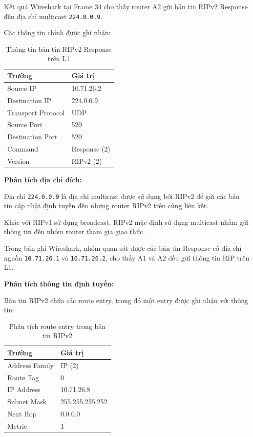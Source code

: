 Kết quả Wireshark tại Frame 34 cho thấy router A2
gửi bản tin RIPv2 Response đến địa chỉ multicast
\texttt{224.0.0.9}.

Các thông tin chính được ghi nhận:

\begin{table}[H]
    \centering
    \caption{Thông tin bản tin RIPv2 Response trên L1}
    \label{tab:n6-rip}
    \renewcommand{\arraystretch}{1.3}
    \begin{tabular}{|l|l|}
        \hline
        \textbf{Trường} & \textbf{Giá trị} \\
        \hline
        Source IP & 10.71.26.2 \\
        \hline
        Destination IP & 224.0.0.9 \\
        \hline
        Transport Protocol & UDP \\
        \hline
        Source Port & 520 \\
        \hline
        Destination Port & 520 \\
        \hline
        Command & Response (2) \\
        \hline
        Version & RIPv2 (2) \\
        \hline
        \end{tabular}
\end{table}

\textbf{Phân tích địa chỉ đích:}

Địa chỉ \texttt{224.0.0.9} là địa chỉ multicast
được sử dụng bởi RIPv2 để gửi các bản tin cập nhật
định tuyến đến những router RIPv2 trên cùng liên kết.

Khác với RIPv1 sử dụng broadcast,
RIPv2 mặc định sử dụng multicast nhằm gửi thông tin
đến nhóm router tham gia giao thức.

Trong bản ghi Wireshark, nhóm quan sát được
các bản tin Response có địa chỉ nguồn
\texttt{10.71.26.1} và \texttt{10.71.26.2},
cho thấy A1 và A2 đều gửi thông tin RIP trên L1.

\textbf{Phân tích thông tin định tuyến:}

Bản tin RIPv2 chứa các route entry,
trong đó một entry được ghi nhận với thông tin:

\begin{table}[H]
    \centering
    \caption{Phân tích route entry trong bản tin RIPv2}
    \label{tab:n6-rip-entry}
    \renewcommand{\arraystretch}{1.3}
    \begin{tabular}{|l|l|}
        \hline
        \textbf{Trường} & \textbf{Giá trị} \\
        \hline
        Address Family & IP (2) \\
        \hline
        Route Tag & 0 \\
        \hline
        IP Address & 10.71.26.8 \\
        \hline
        Subnet Mask & 255.255.255.252 \\
        \hline
        Next Hop & 0.0.0.0 \\
        \hline
        Metric & 1 \\
        \hline
    \end{tabular}
\end{table}


